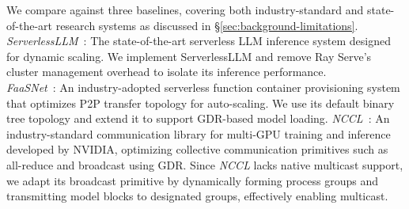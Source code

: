 
We compare \SysName against three baselines, covering both industry-standard and state-of-the-art research systems as discussed in \S\ref{sec:background-limitations}. \\
\textit{ServerlessLLM}~\cite{fu_serverlessllm_2024}: The state-of-the-art serverless LLM inference system designed for dynamic scaling. We implement ServerlessLLM and remove Ray Serve’s~\cite{rayserve} cluster management overhead to isolate its inference performance. \\
\textit{FaaSNet}~\cite{wang_faasnet_nodate}: An industry-adopted serverless function container provisioning system that optimizes P2P transfer topology for auto-scaling. We use its default binary tree topology and extend it to support GDR-based model loading. 
\textit{NCCL}~\cite{nccl}: An industry-standard communication library for multi-GPU training and inference developed by NVIDIA, optimizing collective communication primitives such as all-reduce and broadcast using GDR. 
Since \textit{NCCL} lacks native multicast support, we adapt its broadcast primitive by dynamically forming  process groups and transmitting model blocks to designated groups, effectively enabling multicast. 


